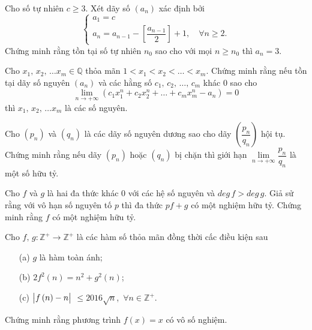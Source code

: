 \begin{bt}%
	Cho số tự nhiên $c\geq 3$. Xét dãy số $(a_n)$ xác định bởi
	\begin{displaymath}
		\begin{cases}		
			a_1=c\\
			a_n=a_{n-1}-\left[ \dfrac{a_{n-1}}{2} \right]+1,\quad \forall n \geq 2.
		\end{cases}
	\end{displaymath}
	Chứng minh rằng tồn tại số tự nhiên $n_0$ sao cho với mọi $n \geq n_0$ thì $a_n=3$.
\end{bt}

\begin{bt}%
	Cho $x_1,\,x_2,\,\ldots x_m \in \mathbb{Q}$ thỏa mãn $1<x_1<x_2<\ldots<x_m$. Chứng minh rằng nếu tồn tại dãy số nguyên $(a_n)$ và các hằng số $c_1,\,c_2,\,\ldots, \,c_m$ khác $0$ sao cho
	\begin{displaymath}
		\lim\limits_{n \to +\infty}\left(c_1x_1^n+c_2x_2^n+\ldots+c_mx_m^n-a_n\right)=0
	\end{displaymath}
	thì $x_1,\,x_2,\,\ldots x_m$ là các số nguyên.
\end{bt}

\begin{bt}%
	Cho $\left(p_n\right)$ và $\left(q_n\right)$ là các dãy số nguyên dương sao cho dãy $\left(\dfrac{p_n}{q_n}\right)$ hội tụ. Chứng minh rằng nếu dãy $\left(p_n\right)$ hoặc $\left(q_n\right)$ bị chặn thì giới hạn $\lim\limits_{n \to +\infty}\dfrac{p_n}{q_n}$ là một số hữu tỷ.
\end{bt}

\begin{bt}[IMO SL 2012]%
	Cho $f$ và $g$ là hai đa thức khác $0$ với các hệ số nguyên và $ deg\, f>deg\, g$. Giả sử rằng với vô hạn số nguyên tố $p$ thì đa thức $pf+g$ có một nghiệm hữu tỷ. Chứng minh rằng $f$ có một nghiệm hữu tỷ.
\end{bt}

\begin{bt}%
	Cho $f,\,g\colon \mathbb{Z}^+ \to \mathbb{Z}^+$ là các hàm số thỏa mãn đồng thời cấc điều kiện sau
	\begin{enumerate}
		\item[\textup{(a)}] $g$ là hàm toàn ánh;
		\item[\textup{(b)}] $2f^2\left(n\right)=n^2+g^2\left(n\right)$;
		\item[\textup{(c)}] $\big{|}f\left(n\right)-n \big{|}$ $\leq 2016\sqrt{n}$,\, $\forall n \in \mathbb{Z}^+$.
	\end{enumerate}
	Chứng minh rằng phương trình $f\left(x\right) =x$ có vô số nghiệm.
\end{bt}




